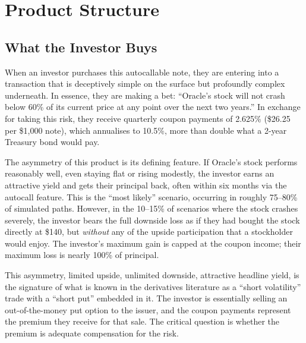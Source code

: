 \documentclass[12pt,a4paper]{article}
\begin{document}
\newpage
\section{Product Structure}
\label{sec:product}

\subsection{What the Investor Buys}

When an investor purchases this autocallable note, they are entering into a transaction that is deceptively simple on the surface but profoundly complex underneath. In essence, they are making a bet: ``Oracle's stock will not crash below 60\% of its current price at any point over the next two years.'' In exchange for taking this risk, they receive quarterly coupon payments of 2.625\% (\$26.25 per \$1,000 note), which annualises to 10.5\%, more than double what a 2-year Treasury bond would pay.

The asymmetry of this product is its defining feature. If Oracle's stock performs reasonably well, even staying flat or rising modestly, the investor earns an attractive yield and gets their principal back, often within six months via the autocall feature. This is the ``most likely'' scenario, occurring in roughly 75--80\% of simulated paths. However, in the 10--15\% of scenarios where the stock crashes severely, the investor bears the full downside loss as if they had bought the stock directly at \$140, but \textit{without} any of the upside participation that a stockholder would enjoy. The investor's maximum gain is capped at the coupon income; their maximum loss is nearly 100\% of principal.

This asymmetry, limited upside, unlimited downside, attractive headline yield, is the signature of what is known in the derivatives literature as a ``short volatility'' trade with a ``short put'' embedded in it. The investor is essentially selling an out-of-the-money put option to the issuer, and the coupon payments represent the premium they receive for that sale. The critical question is whether the premium is adequate compensation for the risk.
\end{document}
